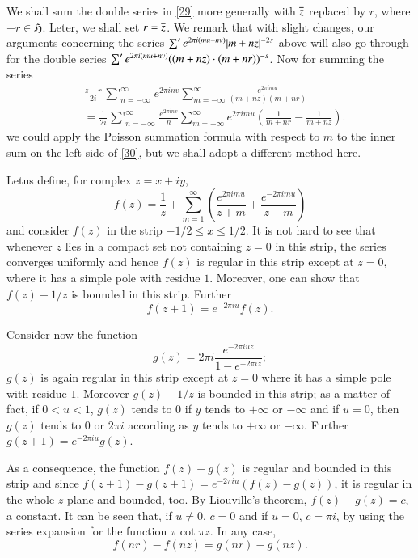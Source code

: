 We shall sum the double series in \eqref{29} more generally with
$\overline{z}$ replaced by $r$, where $-r\in\mathfrak{H}$. Leter, we shall
set $r=\overline{z}$. We remark that with slight changes, our arguments
concerning the series $\sum' e^{2\pi i(mu+nv)}|\break m+nz|^{-2s}$ above will
also go through for the double series $\sum' e^{2\pi
  i(mu+nv)}\break ((m+nz)\cdot (m+nr))^{-s}$. Now for summing the series
\begin{align*}
& \frac{z-r}{2i}\mathop{{\sum}'}^{\infty}_{n=-\infty}e^{2\pi
  inv}\sum^{\infty}_{m=-\infty}\frac{e^{2\pi imu}}{(m+nz)(m+nr)}\\
& =\frac{1}{2i}\mathop{{\sum}'}^{\infty}_{n=-\infty}\frac{e^{2\pi
      inv}}{n}\sum^{\infty}_{m=-\infty}e^{2\pi
    imu}\left(\frac{1}{m+nr}-\frac{1}{m+nz}\right).\tag{30}\label{30} 
\end{align*}
we could apply the Poisson summation formula with respect to $m$ to
the inner sum on the left side of \eqref{30}, but we shall adopt a
different method here. 

Let\pageoriginale us define, for complex $z=x+iy$,
$$
f(z)=\frac{1}{z} + \sum^{\infty}_{m=1}\left(\frac{e^{2\pi
    imu}}{z+m}+\frac{e^{-2\pi imu}}{z-m}\right)
$$
and consider $f(z)$ in the strip $-1/2\leq x\leq 1/2$. It is not hard
to see that whenever $z$ lies in a compact set not containing $z=0$ in
this strip, the series converges uniformly and hence $f(z)$ is regular
in this strip except at $z=0$, where it has a simple pole with residue
$1$. Moreover, one can show that $f(z)-1/z$ is bounded in this
strip. Further
$$
f(z+1)=e^{-2\pi iu}f(z).
$$

Consider now the function
$$
g(z)=2\pi i\frac{e^{-2\pi iuz}}{1-e^{-2\pi iz}};
$$
$g(z)$ is again regular in this strip except at $z=0$ where it has a
simple pole with residue $1$. Moreover $g(z) - 1/z$ is bounded in this
strip; as a matter of fact, if $0<u<1$, $g(z)$ tends to $0$ if $y$
tends to $+\infty$ or $-\infty$ and if $u=0$, then $g(z)$ tends to $0$
or $2\pi i$ according as $y$ tends to $+\infty$ or $-\infty$. Further
$g(z+1)=e^{-2\pi iu}g(z)$.

As a consequence, the function $f(z)-g(z)$ is regular and bounded in
this strip and since $f(z+1)-g(z+1)=e^{-2\pi iu}(f(z)-g(z))$, it is
regular in the whole $z$-plane and bounded, too. By Liouville's
theorem, $f(z)-g(z)=c$, a constant. It can be seen that, if $u\neq 0$,
$c=0$ and if $u=0$, $c=\pi i$, by using the series expansion for the
function $\pi\cot \pi z$. In any case,
\begin{equation*}
f(nr)-f(nz)=g(nr)-g(nz).\tag{31}\label{31}
\end{equation*}

